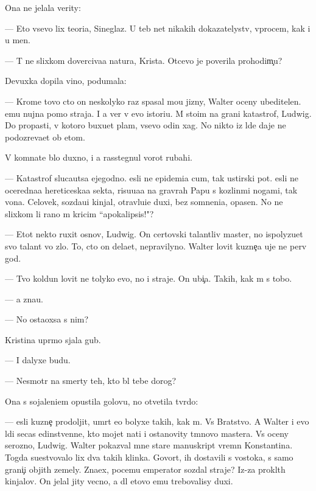 \documentclass[10pt]{book}
\begin{document}
Ona ne jelala verity:

— Eto vsevo lix teori{\y}a, Sineglaz{\yi}{\y}. U teb{\ia} net nikakih dokazatelystv, vprocem, kak i u men{\ia}.

— T{\yi} ne slixkom doverciva{\y}a natura, Krista. Otcevo je poverila prohodim{\c}u?

Devuxka dopila vino, podumala:

— Krome tovo cto on neskolyko raz spasal mo{\y}u jizny, Walter oceny ubeditelen. {\Y}emu nujna pomo{\x} straja. I {\y}a ver{\io} v {\y}evo istori{\y}u. M{\yi} sto{\y}im na grani katastrof{\yi}, Ludwig. Do propasti, v kotoro{\y} buxu{\y}et plam{\ia}, vsevo odin xag. No nikto iz l{\io}de{\y} daje ne podozreva{\y}et ob etom.

V komnate b{\yi}lo duxno, i {\y}a rasstegnul vorot rubahi.

— Katastrof{\yi} sluca{\y}utsa {\y}ejegodno. {\Y}esli ne epidemi{\y}a cum{\yi}, tak {\y}ustirski{\y} pot. {\Y}esli ne oceredna{\y}a hereticeska{\y}a sekta, risu{\y}u{\x}a{\y}a na grav{\io}rah Papu s kozlin{\yi}\-mi nogami, tak vo{\y}na. Celovek, sozda{\y}u{\x}i{\y} kinjal{\yi}, otravl{\ia}{\y}u{\x}i{\y}e duxi, bez somneni{\y}a, opasen. No ne slixkom li rano m{\yi} kricim ``apokalipsis!"?

— Etot nekto ruxit osnov{\yi}, Ludwig. On certovski talantliv{\yi}{\y} master, no ispolyzu{\y}et svo{\y} talant vo zlo. To, cto on dela{\y}et, nepravilyno. Walter lovit kuzne{\c}a uje ne perv{\yi}{\y} god.

— Tvo{\y} koldun lovit ne tolyko {\y}evo, no i straje{\y}. On ubi{\y}{\c}a. Takih, kak m{\yi} s tobo{\y}.

— {\Y}a zna{\y}u.

— No osta{\y}oxsa s nim?

Kristina upr{\ia}mo sjala gub{\yi}.

— I dalyxe budu.

— Nesmotr{\ia} na smerty teh, kto b{\yi}l tebe dorog?

Ona s sojaleni{\y}em opustila golovu, no otvetila tv{\e}rdo:

— {\Y}esli kuzne{\c} prodoljit, umr{\e}t {\y}e{\x}o bolyxe takih, kak m{\yi}. Vs{\e} Bratstvo. A Walter i {\y}evo l{\io}di se{\y}cas {\y}edinstvenn{\yi}{\y}e, kto mojet na{\y}ti i ostanovity t{\e}mnovo mastera. Vs{\e} oceny ser{\y}ozno, Ludwig. Walter pokaz{\yi}val mne star{\yi}{\y}e manuskript{\yi} vrem{\e}n Konstantina. Togda su{\x}estvovalo lix dva takih klinka. Govor{\ia}t, ih dostavili s vostoka, s samo{\y} grani{\c}i objit{\yi}h zemely. Zna{\y}ex, pocemu emperator sozdal straje{\y}? Iz-za pro\-kl{\ia}\-t{\yi}h kinjalov. On jelal jity vecno, a dl{\ia} etovo {\y}emu trebovalisy duxi.
\end{document}
